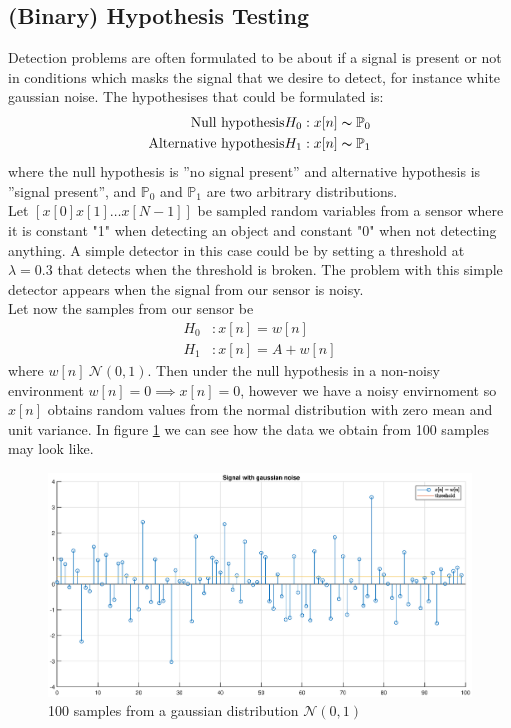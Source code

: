 \subsection{(Binary) Hypothesis Testing}
Detection problems are often formulated to be about if a signal is present or not in conditions which masks the signal that we desire to detect, for instance white gaussian noise. The hypothesises that could be formulated is:
\begin{align}
\begin{split}
	\text{Null hypothesis} H_0 &: x[n] \thicksim \mathbb{P}_0\\
	\text{Alternative hypothesis} H_1 &: x[n] \thicksim \mathbb{P}_1
\end{split}
\end{align}\label{eq:gen_hypothesis_test}
where the null hypothesis is ''no signal present'' and alternative hypothesis is ''signal present'', and $\mathbb{P}_0$ and $\mathbb{P}_1$ are two arbitrary distributions.\\
Let $[x[0] x[1] \dots x[N-1]]$ be sampled random variables from a sensor where it is constant "1" when detecting an object and constant "0" when not detecting anything. A simple detector in this case could be by setting a threshold at $\lambda = 0.3$ that detects when the threshold is broken. The problem with this simple detector appears when the signal from our sensor is noisy.\\
Let now the samples from our sensor be
\begin{align}
	H_0 &: x[n] = w[n]\nonumber\\
	H_1 &: x[n] = A + w[n]\nonumber
\end{align}
where $w[n] ~ \mathcal{N}(0, 1)$. Then under the null hypothesis in a non-noisy environment $w[n] = 0 \implies x[n] = 0$, however we have a noisy envirnoment so $x[n]$ obtains random values from the normal distribution with zero mean and unit variance. In figure \ref{fig:noise} we can see how the data we obtain from 100 samples may look like.
\begin{figure}
	\centering
	\includegraphics[width = \linewidth]{figures/gen_sign_noise.eps}
	\caption{100 samples from a gaussian distribution $\mathcal{N}(0,1)$}
	\label{fig:noise}
\end{figure}

